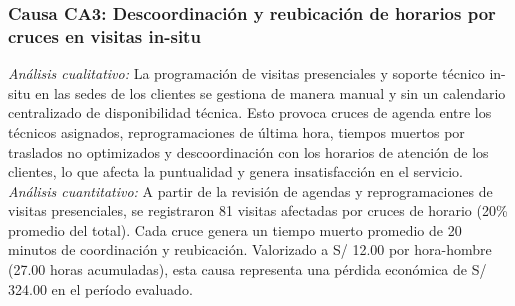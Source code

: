 \subsubsection{Causa CA3: Descoordinación y reubicación de horarios por cruces en visitas in-situ}
\noindent \textit{Análisis cualitativo:} La programación de visitas presenciales y soporte técnico in-situ en las sedes de los clientes se gestiona de manera manual y sin un calendario centralizado de disponibilidad técnica. Esto provoca cruces de agenda entre los técnicos asignados, reprogramaciones de última hora, tiempos muertos por traslados no optimizados y descoordinación con los horarios de atención de los clientes, lo que afecta la puntualidad y genera insatisfacción en el servicio. \\

\noindent \textit{Análisis cuantitativo:} 
A partir de la revisión de agendas y reprogramaciones de visitas presenciales, se registraron 81 visitas afectadas por cruces de horario (20\% promedio del total). Cada cruce genera un tiempo muerto promedio de 20 minutos de coordinación y reubicación. Valorizado a S/ 12.00 por hora-hombre (27.00 horas acumuladas), esta causa representa una pérdida económica de S/ 324.00 en el período evaluado.

